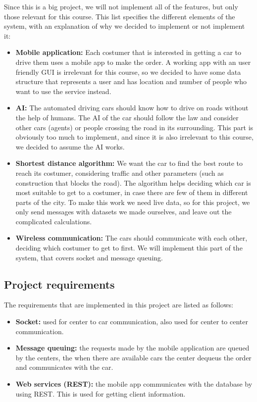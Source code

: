\documentclass[a4paper]{article}
\begin{document}
Since this is a big project, we will not implement all of the features, but only those relevant for this course. This list specifies the different elements of the system, with an explanation of why we decided to implement or not implement it:
\begin{itemize}
    \item \textbf{Mobile application:} Each costumer that is interested in getting a car to drive them uses a mobile app to make the order. A working app with an user friendly GUI is irrelevant for this course, so we decided to have some data structure that represents a user and has location and number of people who want to use the service instead.
    \item \textbf{AI:} The automated driving cars should know how to drive on roads without the help of humans. The AI of the car should follow the law and consider other cars (agents) or people crossing the road in its surrounding. This part is obviously too much to implement, and since it is also irrelevant to this course, we decided to assume the AI works.
    \item \textbf{Shortest distance algorithm:} We want the car to find the best route to reach its costumer, considering traffic and other parameters (such as construction that blocks the road). The algorithm helps deciding which car is most suitable to get to a costumer, in case there are few of them in different parts of the city. To make this work we need live data, so for this project, we only send messages with datasets we made ourselves, and leave out the complicated calculations.
    \item \textbf{Wireless communication:} The cars should communicate with each other, deciding which costumer to get to first. We will implement this part of the system, that covers socket and message queuing.
\end{itemize}

\subsection*{Project requirements}
The requirements that are implemented in this project are listed as follows:
\begin{itemize}
    \item \textbf{Socket:} used for center to car communication, also used for center to center communication.
    \item \textbf{Message queuing:} the requests made by the mobile application are queued by the centers, the when there are available cars the center dequeus the order and communicates with the car.
    \item \textbf{Web services (REST):} the mobile app communicates with the database by using REST. This is used for getting client information.
\end{itemize}
\end{document}
